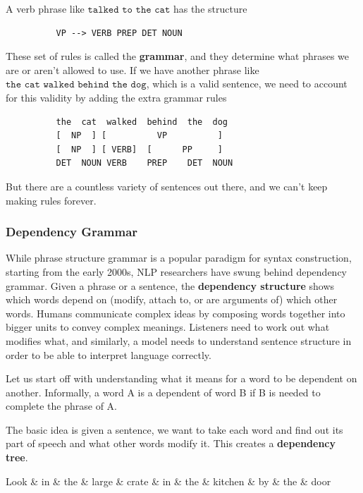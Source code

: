 \documentclass{article}
\begin{document}
      A verb phrase like $\texttt{talked to the cat}$ has the structure 
      \begin{lstlisting}
          VP --> VERB PREP DET NOUN
      \end{lstlisting}
      These set of rules is called the \textbf{grammar}, and they determine what phrases we are or aren't allowed to use. If we have another phrase like $\texttt{the cat walked behind the dog}$, which is a valid sentence, we need to account for this validity by adding the extra grammar rules 
      \begin{lstlisting}
          the  cat  walked  behind  the  dog 
          [  NP  ] [          VP          ]
          [  NP  ] [ VERB]  [      PP     ]
          DET  NOUN VERB    PREP    DET  NOUN 
      \end{lstlisting}
      But there are a countless variety of sentences out there, and we can't keep making rules forever. 

    \subsubsection{Dependency Grammar}

      While phrase structure grammar is a popular paradigm for syntax construction, starting from the early 2000s, NLP researchers have swung behind dependency grammar. Given a phrase or a sentence, the \textbf{dependency structure} shows which words depend on (modify, attach to, or are arguments of) which other words. Humans communicate complex ideas by composing words together into bigger units to convey complex meanings. Listeners need to work out what modifies what, and similarly, a model needs to understand sentence structure in order to be able to interpret language correctly. 

      Let us start off with understanding what it means for a word to be dependent on another. Informally, a word A is a dependent of word B if B is needed to complete the phrase of A. 

      The basic idea is given a sentence, we want to take each word and find out its part of speech and what other words modify it. This creates a \textbf{dependency tree}. 

      \begin{center}
        \begin{dependency}[theme = simple]
        \begin{deptext}[column sep=1em]
        Look \& in \& the \& large \& crate \& in \& the \& kitchen \& by \& the \& door \\
        \end{deptext}
        \end{dependency}
      \end{center}
\end{document}
